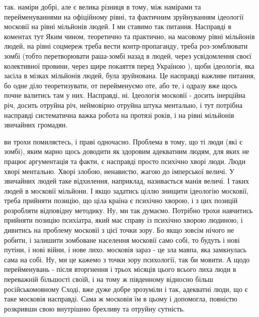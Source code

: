 так. наміри добрі, але є велика різниця в тому, між намірами та
перейменуваннями на офіційному рівні, та фактичним зруйнуванням ідеології
московії на рівні мільйонів людей. І ми ставимо так питання. Насправді в
коментах тут  Яким чином, теоретично та практично, на масовому рівні мільйонів
людей, на рівні соцмереж треба вести контр-пропаганду, треба роз-зомблювати
зомбі (тобто перетворювати раша-зомбі назад в людей, через усвідомлення своєї
колективної провини, через щире покаяття перед Україною ), щоби ідеологія, яка
засіла в мізках мільйонів людей, була зруйнована. Це насправді важливе питання,
бо одне діло теоретизувати, от перейменуємо оте, або те, і одразу вже щось
почне валитись там у них. Насправді, ні. Ідеологія московії - досить інерційна
річ, досить отруйна річ, неймовірно отруйна штука ментально, і тут потрібна
насправді систематична важка робота на протязі років, і на рівні мільйонів
звичайних громадян. 

ви трохи помиляєтесь, і праві одночасно. Проблема в тому, що ті люди (які є
зомбі), яким марно щось доводити як здоровим адекватним людям, для яких не
працює аргументація та факти, є насправді просто психічно хворі люди. Люди
хворі ментально. Хворі злобою, ненавистю, жагою до імперської величі. У
звичайних людей таке відхилення, наприклад, називається манія величі. І таких
людей в московії мільйони. І якщо задатись ціллю знищити ідеологію московії,
треба прийняти позицію, що ціла країна є психічно хворою, і з цих позицій
розробляти відповідну методику. Ну, ми так думаємо. Потрібно трохи навчитись
прийняти позицію психіатра, який має справу із психічно хворою людиною, і
дивитись на проблему московїі з цієї точки зору. Бо якщо зовсім нічого не
робити, і залишити зомбоване населення московії само собі, то будуть і нові
путіни, і нові війни, і нове лихо. московія зараз - це зла мавпа, яка
замкнулась сама на собі. Ну, ми це кажемо з точки зору психології, так би
мовити. А щодо перейменувань - після вторгнення і трьох місяців цього всього
лиха люди в переважній більшості своїй, і на тому ж південному відносно більш
російськомовному Сході, вже дуже добре зрозуміли і так, адекватні люди, що є
таке московія насправді. Сама ж московія їм в цьому і допомогла, повністю
розкривши свою внутрішню брехливу та отруйну сутність.

